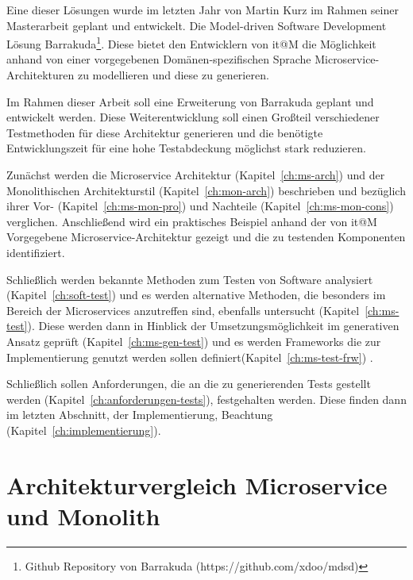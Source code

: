 \documentclass[12pt,a4paper,bibliography=totocnumbered,listof=totocnumbered]{scrartcl}
\begin{document}
Eine dieser Lösungen wurde im letzten Jahr von Martin Kurz im Rahmen seiner Masterarbeit \cite{mkthesis} geplant und entwickelt. Die Model-driven Software Development Lösung Barrakuda\footnote{Github Repository von Barrakuda (https://github.com/xdoo/mdsd)}. Diese bietet den Entwicklern von it@M die Möglichkeit anhand von einer vorgegebenen Domänen-spezifischen Sprache Microservice-Architekturen zu modellieren und diese zu generieren.

Im Rahmen dieser Arbeit soll eine Erweiterung von Barrakuda geplant und entwickelt werden. Diese Weiterentwicklung soll einen Großteil verschiedener Testmethoden für diese Architektur generieren und die benötigte Entwicklungszeit für eine hohe Testabdeckung möglichst stark reduzieren.

Zunächst werden die Microservice Architektur (Kapitel~\ref{ch:ms-arch}) und der Monolithischen Architekturstil (Kapitel~\ref{ch:mon-arch}) beschrieben und bezüglich ihrer Vor- (Kapitel~\ref{ch:ms-mon-pro}) und Nachteile (Kapitel~\ref{ch:ms-mon-cons}) verglichen. Anschließend wird ein praktisches Beispiel anhand der von it@M Vorgegebene Microservice-Architektur gezeigt und die zu testenden Komponenten identifiziert.

Schließlich werden bekannte Methoden zum Testen von Software analysiert (Kapitel~\ref{ch:soft-test}) und es werden alternative Methoden, die besonders im Bereich der Microservices anzutreffen sind, ebenfalls untersucht (Kapitel~\ref{ch:ms-test}). Diese werden dann in Hinblick der Umsetzungsmöglichkeit im generativen Ansatz geprüft (Kapitel~\ref{ch:ms-gen-test})  und es werden Frameworks die zur Implementierung genutzt werden sollen definiert(Kapitel~\ref{ch:ms-test-frw}) .

Schließlich sollen Anforderungen, die an die zu generierenden Tests gestellt werden (Kapitel~\ref{ch:anforderungen-tests}), festgehalten werden. Diese finden dann im letzten Abschnitt, der Implementierung, Beachtung (Kapitel~\ref{ch:implementierung}).

\section{Architekturvergleich Microservice und Monolith}
\end{document}
